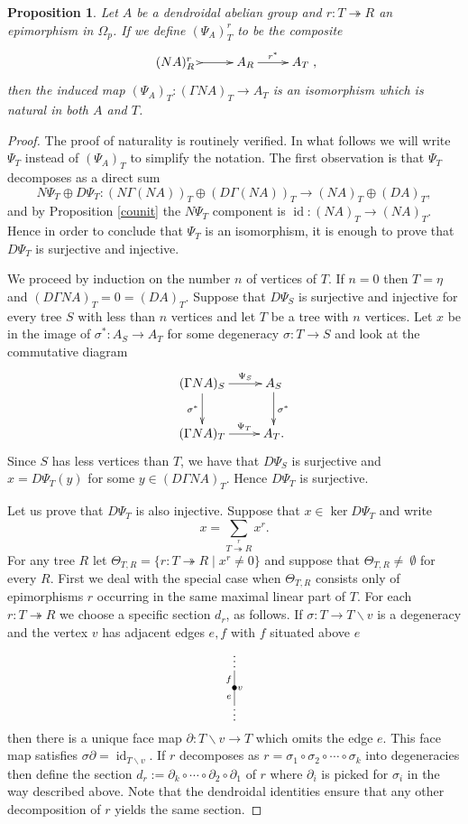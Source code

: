 \documentclass[a4paper]{amsart}
\theoremstyle{plain}
\newtheorem{prop}[thm]{Proposition}
\theoremstyle{definition}
\theoremstyle{remark}
\DeclareMathOperator{\id}{id}
\newcommand{\rpd}{\Omega_p}
\newcommand{\To}{\longrightarrow}
\newcommand{\X}{\Theta}
\numberwithin{equation}{section}
\numberwithin{figure}{section}
\begin{document}
\begin{prop}\label{unit}
Let $A$ be a dendroidal abelian group and $r\colon T\twoheadrightarrow R$ an epimorphism in $\rpd$. If we define $(\Psi_A)_T^r$ to be the composite
\[
\xymatrix{(NA)_R^r\ \ar@{>->}[r] &A_R\ar[r]^-{r^*} &A_T},
\]
then the induced map $(\Psi_A)_T\colon(\Gamma NA)_T\To A_T$ is an isomorphism which is natural in both $A$ and $T$.
\end{prop}
\begin{proof}
The proof of naturality is routinely verified. In what follows we will write $\Psi_T$ instead of $(\Psi_A)_T$ to simplify the notation. The first observation is that $\Psi_T$ decomposes as a direct sum
\[
 N\Psi_T\oplus D\Psi_T\colon (N\Gamma (NA))_T\oplus (D\Gamma (NA))_T\To (NA)_T\oplus (DA)_T,
\]
and by Proposition \ref{counit} the $N\Psi_T$ component is $\id\colon (NA)_T\To (NA)_T$. Hence in order to conclude that $\Psi_T$ is an isomorphism, it is enough to prove that $D\Psi_T$ is surjective and injective.

We proceed by induction on the number $n$ of vertices of $T$. If $n=0$ then $T=\eta$ and $(D\Gamma NA)_T=0=(DA)_T$.
Suppose that $D\Psi_S$ is surjective and injective for every tree $S$ with less than $n$ vertices and let $T$ be a tree with $n$ vertices.
Let $x$ be in the image of $\sigma^*\colon A_S\To A_T$  for some degeneracy $\sigma\colon T\To S$ and look at the commutative diagram
\[
\xymatrix{(\Gamma N A)_S\ar[r]^-{\Psi_S}\ar[d]_{\sigma^*} & A_S\ar[d]^{\sigma^*}\\
(\Gamma N A)_T\ar[r]^-{\Psi_T} &A_T.}
\]
Since $S$ has less vertices than $T$, we have that $D\Psi_S$ is surjective and $x=D\Psi_T(y)$ for some $y\in(D\Gamma N A)_T$. Hence $D\Psi_T$ is surjective.

Let us prove that $D\Psi_T$ is also injective. Suppose that $x\in \ker D\Psi_T$ and write
\[
x=\sum_{ \stackrel {r}{T\twoheadrightarrow R}} x^r.
\]
For any tree $R$ let $\X_{T,R}=\{r\colon T\twoheadrightarrow R\mid x^r\ne 0\}$ and suppose that $\X_{T,R}\neq~\emptyset$ for every $R$.
First we deal with the special case when $\X_{T,R}$ consists only of
epimorphisms $r$ occurring in the same maximal linear part of $T$.
For each $r\colon T\twoheadrightarrow R$ we choose a specific
section $d_r$, as follows. If $\sigma\colon T\to T\backslash v$ is a
degeneracy and the vertex $v$ has adjacent edges $e,f$ with $f$
situated above $e$
\[
\xy<0.08cm,0cm>:
(0,10.5)*{\vdots};
(0,-8)*{\vdots};
(0,6)*=0{}="1";
(0,0)*=0{\bullet}="2";
(0,-6)*=0{}="3";
(2,0)*{\scriptstyle v};
(-2,3)*{\scriptstyle f};
(-2,-3)*{\scriptstyle e};
"1";"2" **\dir{-};
"2";"3" **\dir{-};
\endxy
\]
then there is a unique face map $\partial\colon T\backslash v \To T$
which omits the edge $e$. This face map satisfies
$\sigma\partial=\id_{T\backslash v}$. If $r$ decomposes as
$r=\sigma_1\circ\sigma_2\circ\cdots\circ\sigma_k$ into degeneracies
then define the section
$d_r:=\partial_k\circ\cdots\circ\partial_2\circ\partial_1$ of $r$
where $\partial_i$ is picked for $\sigma_i$ in the way described
above. Note that the dendroidal identities ensure that any other
decomposition of $r$ yields the same section.


\end{proof}
\end{document}
